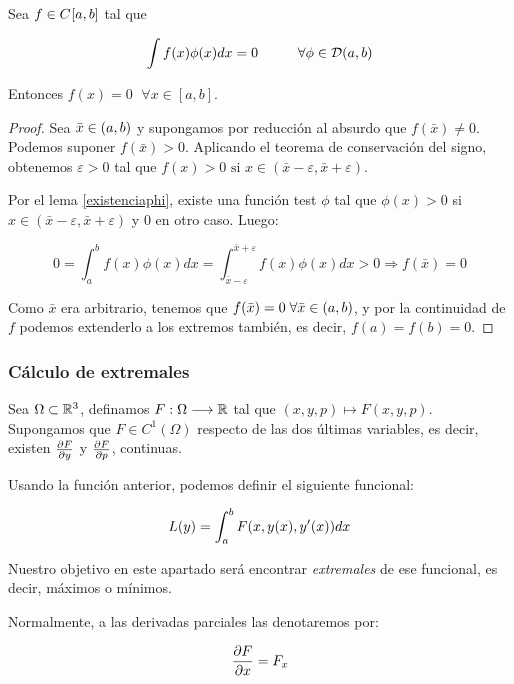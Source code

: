 \begin{theorem}
\label{theorem:1.3}
Sea $f\in C^{  }[a,b]$ tal que

\[
\int f(x)\phi(x)dx=0 \hspace{1cm} \forall \phi \in \mathcal{D}(a,b)
\]

Entonces $f(x)=0 \;$  $\forall x\in [a,b]$.

\end{theorem}

\begin{proof}

Sea $\bar{x}\in (a,b)$ y supongamos por reducción al absurdo que $f(\bar{x})\neq 0$. Podemos suponer $f(\bar{x})>0$. Aplicando el teorema de conservación del signo, obtenemos $\varepsilon>0$ tal que $f(x)>0 \text{ si } x \in (\bar{x}-\varepsilon,\bar{x}+\varepsilon)$.

Por el lema \ref{existenciaphi}, existe una función test $\phi$ tal que $\phi(x)>0$ si $x\in(\bar{x}-\varepsilon, \bar{x}+\varepsilon)$ y $0$ en otro caso. Luego:

\[
0=\int_{a}^{b}f(x)\phi(x)dx=\int_{\bar{x}-\varepsilon}^{\bar{x}+\varepsilon}f(x)\phi(x)dx>0 \Rightarrow f(\bar{x})=0
\]

Como $\bar{x}$ era arbitrario, tenemos que $f(\bar{x})=0 \; \forall \bar{x}\in(a,b)$, y por la continuidad de $f$ podemos extenderlo a los extremos también, es decir, $f(a)=f(b)=0$.

\end{proof}

\subsubsection{Cálculo de extremales}

Sea $\Omega\subset\mathbb{R}^3$, definamos $F:\Omega \longrightarrow \mathbb{R}$ tal que $(x,y,p)\longmapsto F(x,y,p)$. Supongamos que $F\in C^1(\Omega)$  respecto de las dos últimas variables, es decir, existen $\frac{\partial F }{\partial y }$ y $\frac{\partial F }{\partial p }$, continuas. 

Usando la función anterior, podemos definir el siguiente funcional:

\begin{equation}\label{funcional}
L(y) = \int_{a}^{b}F(x,y(x),y'(x)) dx 
\end{equation}


Nuestro objetivo en este apartado será encontrar \textit{extremales} de ese funcional, es decir, máximos o mínimos.

\begin{notacion}
Normalmente, a las derivadas parciales las denotaremos por:

\[
\frac{\partial F }{\partial x }=F_x
\]

\end{notacion}


